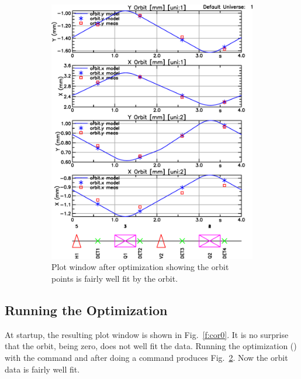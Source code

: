 \documentclass{hitec}     %
\begin{document}
{\begin{figure}[t]
\begin{subfigure}[t]{0.49\textwidth}
    \includegraphics[width=\textwidth]{cor1.pdf}
    \caption{Plot window after optimization showing the  orbit points is fairly 
well fit by the  orbit.}
    \label{f:cor1}
  \end{subfigure}
  \caption{}
\end{figure}

\subsection{Running the Optimization}
\label{s:cor.run}

At startup, the resulting plot window is shown in Fig.~\ref{f:cor0}. It is no surprise that the
 orbit, being zero, does not well fit the  data. Running the optimization
() with the  command and after doing a  command produces
Fig.~\ref{f:cor1}. Now the  orbit data is fairly well fit.

}
\end{document}
